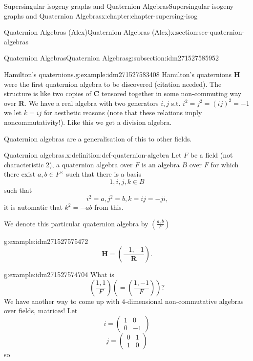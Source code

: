 \documentclass[oneside,10pt,]{book}
\numberwithin{equation}{section}
\newcommand{\legendre}[2]{\left(\frac{#1}{#2}\right)}
\newcommand{\RR}{\mathbf{R}}
\newcommand{\CC}{\mathbf{C}}
\newcommand{\HH}{\mathbf{H}}
\newcommand{\amp}{&}
\begin{document}
\begin{chapterptx}{Supersingular isogeny graphs and Quaternion Algebras}{}{Supersingular isogeny graphs and Quaternion Algebras}{}{}{x:chapter:chapter-supersing-isog}
\begin{sectionptx}{Quaternion Algebras (Alex)}{}{Quaternion Algebras (Alex)}{}{}{x:section:sec-quaternion-algebras}
\begin{subsectionptx}{Quaternion Algebras}{}{Quaternion Algebras}{}{}{g:subsection:idm271527585952}
\begin{introduction}{}
\begin{example}{Hamilton's quaternions.}{g:example:idm271527583408}
Hamilton's quaternions \(\HH\) were the first quaternion algebra to be discovered (citation needed). The structure is like two copies of \(\CC\) tensored together in some non-commuting way over \(\RR\). We have a real algebra with two generators \(i,j\) s.t. \(i^2 = j^2  = (ij)^2 = -1\) we let \(k = ij\) for aesthetic reasons (note that these relations imply noncommutativity!). Like this we get a division algebra.%
\end{example}
Quaternion algebras are a generalisation of this to other fields.%
\begin{definition}{Quaternion algebras.}{x:definition:def-quaternion-algebra}%
Let \(F\) be a field (not characteristic 2), a quaternion algebra over \(F\) is an algebra \(B\) over \(F\) for which there exist \(a,b\in F^\times\) such that there is a basis%
\begin{equation*}
1,i,j,k \in B
\end{equation*}
such that%
\begin{equation*}
i^2 = a,j^2=b,k=ij=-ji\text{,}
\end{equation*}
it is automatic that \(k^2 = -ab\) from this.%
\par
We denote this particular quaternion algebra by \(\legendre{a,b}{F}\)%
\end{definition}
\begin{example}{}{g:example:idm271527575472}%
%
\begin{equation*}
\HH = \legendre{-1,-1}{\RR}\text{.}
\end{equation*}
%
\end{example}
\begin{example}{}{g:example:idm271527574704}%
What is%
\begin{equation*}
\legendre{1,1}{F} \left( = \legendre{1,-1}{F}\right)\text{?}
\end{equation*}
We have another way to come up with \(4\)-dimensional non-commutative algebras over fields, matrices! Let%
\begin{equation*}
i=  \begin{pmatrix} 1\amp0\\0\amp -1\end{pmatrix}
\end{equation*}
%
\begin{equation*}
j =\begin{pmatrix} 0\amp1\\1\amp 0\end{pmatrix}
\end{equation*}
so%
\begin{equation*}

\end{equation*}
\end{example}
\end{introduction}
\end{subsectionptx}
\end{sectionptx}
\end{chapterptx}
\end{document}
